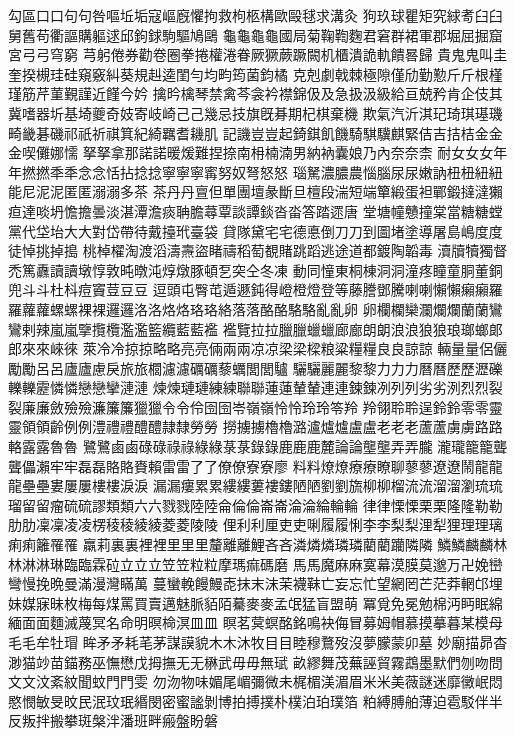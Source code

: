 勾區⼝口句句咎嘔坵垢寇嶇廐懼拘救枸柩構歐毆毬求溝灸
狗玖球瞿矩究絿耉⾅臼舅舊苟衢謳購軀逑邱鉤銶駒驅鳩鷗
⿔龜龜龜國局菊鞠鞫麴君窘群裙軍郡堀屈掘窟宮⼸弓穹窮
芎躬倦券勸卷圈拳捲權淃眷厥獗蕨蹶闕机櫃潰詭軌饋晷歸
貴⿁鬼叫圭奎揆槻珪硅窺竅糾葵規赳逵閨勻均畇筠菌鈞橘
克剋劇戟棘極隙僅劤勤懃⽄斤根槿瑾筋芹菫覲謹近饉今妗
擒昑檎琴禁禽芩衾衿襟錦伋及急扱汲級給亘兢矜肯企伎其
冀嗜器圻基埼夔奇妓寄岐崎⼰己幾忌技旗旣朞期杞棋棄機
欺氣汽沂淇玘琦琪璂璣畸畿碁磯祁祇祈祺箕紀綺羈耆耭肌
記譏豈豈起錡錤飢饑騎騏驥麒緊佶吉拮桔⾦金金喫儺娜懦
拏拏拿那諾諾暖煖難捏捺南枏楠湳男納衲囊娘乃內奈奈柰
耐⼥女女年年撚撚秊秊念念恬拈捻捻寧寧寧寗努奴弩怒怒
瑙駑濃膿農惱腦尿尿嫩訥杻杻紐紐能尼泥泥匿匿溺溺多茶
茶丹丹亶但單團壇彖斷旦檀段湍短端簞緞蛋袒鄲鍛撻澾獺
疸達啖坍憺擔曇淡湛潭澹痰聃膽蕁覃談譚錟沓畓答踏遝唐
堂塘幢戇撞棠當糖糖螳黨代垈坮⼤大對岱帶待戴擡玳臺袋
貸隊黛宅宅德悳倒⼑刀到圖堵塗導屠島嶋度度徒悼挑掉搗
桃棹櫂淘渡滔濤燾盜睹禱稻萄覩賭跳蹈逃途道都鍍陶韜毒
瀆牘犢獨督禿篤纛讀讀墩惇敦旽暾沌焞燉豚頓乭突仝冬凍
動同憧東桐棟洞洞潼疼瞳童胴董銅兜⽃斗杜枓痘竇荳⾖豆
逗頭屯臀芚遁遯鈍得嶝橙燈登等藤謄鄧騰喇喇懶懶癩癩羅
羅蘿蘿螺螺裸裸邏邏洛洛烙烙珞珞絡落落酪酪駱駱亂亂卵
卵欄欄欒瀾爛爛蘭蘭鸞鸞剌辣嵐嵐擥攬欖濫濫籃纜藍藍襤
襤覽拉拉臘臘蠟蠟廊廊朗朗浪浪狼狼琅瑯螂郞郎來來崍徠
萊冷冷掠掠略略亮亮倆兩兩凉凉梁梁樑粮粱糧糧良良諒諒
輛量量侶儷勵勵呂呂廬廬慮戾旅旅櫚濾濾礪礪藜蠣閭閭驢
驪驪麗麗黎黎⼒力力曆曆歷歷瀝礫轢轢靂憐憐戀戀攣漣漣
煉煉璉璉練練聯聯蓮蓮輦輦連連鍊鍊冽列列劣劣洌烈烈裂
裂廉廉斂殮殮濂簾簾獵獵令令伶囹囹岺嶺嶺怜怜玲玲笭羚
羚翎聆聆逞鈴鈴零零靈靈領領齡例例澧禮禮醴醴隷隸勞勞
撈擄擄櫓櫓潞瀘爐爐盧盧⽼老老蘆蘆虜虜路路輅露露魯魯
鷺鷺⿄鹵碌碌祿祿綠綠菉菉錄錄⿅鹿鹿麓論論壟壟弄弄朧
瀧瓏籠籠聾聾儡瀨牢牢磊磊賂賂賚賴雷雷了了僚僚寮寮廖
料料燎燎療療瞭聊蓼蓼遼遼鬧⿓龍龍壘壘婁屢屢樓樓淚淚
漏漏瘻累累縷縷蔞褸鏤陋陋劉劉旒柳柳榴流流溜溜瀏琉琉
瑠留留瘤硫硫謬類類六六戮戮陸陸侖倫倫崙崙淪淪綸輪輪
律律慄慄栗栗隆隆勒勒肋肋凜凜凌凌楞稜稜綾綾菱菱陵陵
俚利利厘吏吏唎履履悧李李梨梨浬犁狸理理璃痢痢籬罹罹
羸莉裏裏裡裡⾥里里釐離離鯉吝吝潾燐燐璘璘藺藺躪隣隣
鱗鱗麟麟林林淋淋琳臨臨霖砬⽴立立笠笠粒粒摩瑪痲碼磨
⾺馬魔⿇麻寞幕漠膜莫邈万卍娩巒彎慢挽晩曼滿漫灣瞞萬
蔓蠻輓饅鰻唜抹末沫茉襪靺亡妄忘忙望網罔芒茫莽輞邙埋
妹媒寐昧枚梅每煤罵買賣邁魅脈貊陌驀⿆麥孟氓猛盲盟萌
冪覓免冕勉棉沔眄眠綿緬⾯面麵滅蔑冥名命明暝椧溟⽫皿
瞑茗蓂螟酩銘鳴袂侮冒募姆帽慕摸摹暮某模母⽑毛牟牡瑁
眸⽭矛耗芼茅謀謨貌⽊木沐牧⽬目睦穆鶩歿沒夢朦蒙卯墓
妙廟描昴杳渺猫竗苗錨務巫憮懋戊拇撫⽆无楙武⽏毋無珷
畝繆舞茂蕪誣貿霧鵡墨默們刎吻問⽂文汶紊紋聞蚊⾨門雯
勿沕物味媚尾嵋彌微未梶楣渼湄眉⽶米美薇謎迷靡黴岷悶
愍憫敏旻旼民泯玟珉緡閔密蜜謐剝博拍搏撲朴樸泊珀璞箔
粕縛膊舶薄迫雹駁伴半反叛拌搬攀斑槃泮潘班畔瘢盤盼磐
